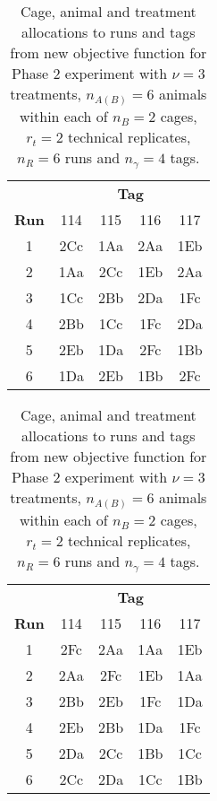 \begin{table}[ht]                                         
\centering    
\itshape                                            
\caption{Cage, animal and treatment allocations to runs and tags from objective function~(\ref{eq:finalObjFun2}) for the Phase 2 experiment with $\nu = 3$ treatments, $n_{A(B)} = 6$ animals within each of $n_B = 2$ cages, $r_t = 2$ technical replicates, $n_R = 6$ runs and $ n_\gamma = 4$ tags.}             
\begin{tabular}[t]{c|cccc}                                   
 & \multicolumn{4}{c}{{\bf Tag}} \\                       
{\bf Run}  & \textnormal{114} & \textnormal{115} & \textnormal{116} & \textnormal{117} \\ 
\hline                                                    
\textnormal{1} & 2Cc & 1Aa & 2Aa & 1Eb \\                                  
\textnormal{2} & 1Aa & 2Cc & 1Eb & 2Aa \\                                  
\textnormal{3} & 1Cc & 2Bb & 2Da & 1Fc \\                                  
\textnormal{4} & 2Bb & 1Cc & 1Fc & 2Da \\                                  
\textnormal{5} & 2Eb & 1Da & 2Fc & 1Bb \\                                  
\textnormal{6} & 1Da & 2Eb & 1Bb & 2Fc \\                                  
\end{tabular}                                             
\label{tab:cagAniDes3}                                    
              
 \caption{Cage, animal and treatment allocations to runs and tags from new objective function for Phase 2 experiment with $\nu = 3$ treatments, $n_{A(B)} = 6$ animals within each of $n_B = 2$ cages, $r_t = 2$ technical replicates, $n_R = 6$ runs and $ n_\gamma = 4$ tags.}                           
 \begin{tabular}[t]{c|cccc} 
 & \multicolumn{4}{c}{{\bf Tag}}\\                                   
{\bf Run}  & \textnormal{114} & \textnormal{115} & \textnormal{116} & \textnormal{117} \\ 
\hline                                                    
\textnormal{1} & 2Fc & 2Aa & 1Aa & 1Eb \\                                              
\textnormal{2} & 2Aa & 2Fc & 1Eb & 1Aa \\                                              
\textnormal{3} & 2Bb & 2Eb & 1Fc & 1Da \\                                              
\textnormal{4} & 2Eb & 2Bb & 1Da & 1Fc \\                                              
\textnormal{5} & 2Da & 2Cc & 1Bb & 1Cc \\                                              
\textnormal{6} & 2Cc & 2Da & 1Cc & 1Bb \\                                              
 \end{tabular}         
 \label{tab:cagAniDes4}    
 \end{table} 
